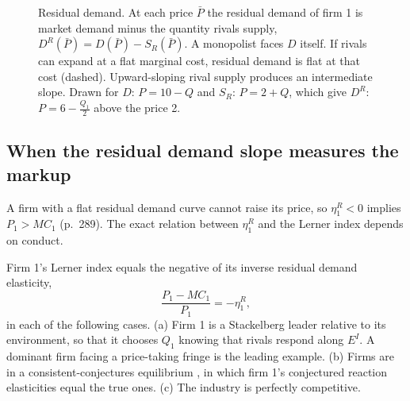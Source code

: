 \begin{figure}[htbp]
\centering
{}
\caption{Residual demand. At each price $\bar P$ the residual demand of firm 1 is market demand minus the
quantity rivals supply, $D^R(\bar P) = D(\bar P) - S_R(\bar P)$. A monopolist faces $D$ itself. If rivals can
expand at a flat marginal cost, residual demand is flat at that cost (dashed). Upward-sloping rival supply
produces an intermediate slope. Drawn for $D$: $P = 10 - Q$ and $S_R$: $P = 2 + Q$, which give $D^R$: $P = 6 -
\frac{Q_1}{2}$ above the price 2.}
\label{fig:03-residual-demand}
\end{figure}

\subsection{When the residual demand slope measures the markup}\label{sec:03-rd-markup}

A firm with a flat residual demand curve cannot raise its price, so $\eta^R_1 < 0$ implies $P_1 > MC_1$
(p.~289). The exact relation between $\eta^R_1$ and the Lerner index depends on conduct.

\begin{proposition}\label{prop:03-rd-markup}
Firm 1's Lerner index equals the negative of its inverse residual demand elasticity,
\begin{equation}\label{eq:03-bb-markup}
  \frac{P_1 - MC_1}{P_1} = -\eta^R_1,
\end{equation}
in each of the following cases. (a) Firm 1 is a Stackelberg leader relative to its environment, so that it
chooses $Q_1$ knowing that rivals respond along $E^I$. A dominant firm facing a price-taking fringe is the
leading example. (b) Firms are in a consistent-conjectures equilibrium \citep{Bresnahan1981a}, in which firm
1's conjectured reaction elasticities equal the true ones. (c) The industry is perfectly competitive.
\end{proposition}

